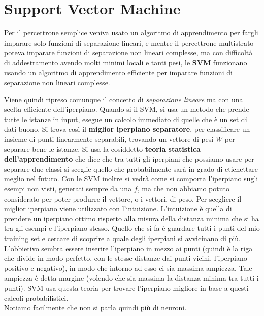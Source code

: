 \section{Support Vector Machine}
Per il percettrone semplice veniva usato un algoritmo di apprendimento per fargli imparare solo funzioni di separazione lineari, e mentre il percettrone multistrato poteva imparare funzioni di separazione non lineari complesse, ma con difficoltà di addestramento avendo molti minimi locali e tanti pesi, le \textbf{SVM} funzionano usando un algoritmo di apprendimento efficiente per imparare funzioni di separazione non lineari complesse. 

Viene quindi ripreso comunque il concetto di \textit{separazione lineare} ma con una scelta efficiente dell'iperpiano. Quando si il SVM, si usa un metodo che prende tutte le istanze in input, esegue un calcolo immediato di quelle che è un set di dati buono. Si trova così il \textbf{miglior iperpiano separatore}, per classificare un insieme di punti linearmente separabili, trovando un vettore di pesi $W$ per separare bene le istanze. 
Si usa la cosiddetto \textbf{teoria statistica dell’apprendimento} che dice che tra tutti gli iperpiani che possiamo usare per separare due classi si sceglie quello che probabilmente sarà in grado di etichettare meglio nel futuro. Con le SVM inoltre si vedrà come si comporta l'iperpiano sugli esempi non visti, generati sempre da una $f$, ma che non abbiamo potuto considerato per poter produrre il vettore, o i vettori, di peso.  
Per scegliere il miglior iperpiano viene utilizzato con l'intuizione. L'intuizione è quella di prendere un iperpiano ottimo rispetto alla misura della distanza minima che si ha tra gli esempi e l'iperpiano stesso.
Quello che si fa è guardare tutti i punti del mio training set e cercare di scoprire a quale degli iperpiani si avvicinano di più. L'obbietivo sembra essere inserire l'iperpiano in mezzo ai punti (quindi è la riga che divide in modo perfetto, con le stesse distanze dai punti vicini, l'iperpiano positivo e negativo), in modo che intorno ad esso ci sia massima ampiezza. Tale ampiezza è detta margine (volendo che sia massima la distanza minima tra tutti i punti). SVM usa questa teoria per trovare l'iperpiano migliore in base a questi calcoli probabilistici.  \\
Notiamo facilmente che non si parla quindi più di neuroni. \\

